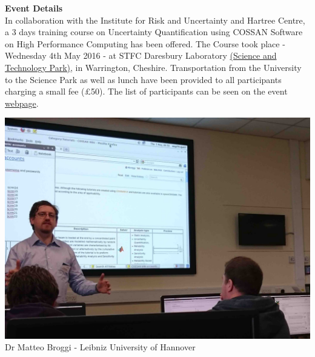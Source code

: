 \documentclass[11pt]{article}%
\begin{document}
\begin{minipage}{0.6\textwidth}
{\bf Event Details}\\
In collaboration with the Institute for Risk and Uncertainty and Hartree Centre, a 3 days training course on Uncertainty Quantification using COSSAN Software on High Performance Computing has been offered. The Course took place - Wednesday 4th May 2016 - at STFC Daresbury Laboratory \href{http://maps.google.com/maps?f=q\&source=s_q\&hl=en&geocode=\&q=Daresbury+Innovation+Centre+Warrington+WA4+4FS+United+Kingdom}{(Science and Technology Park)}, in Warrington, Cheshire. Transportation from the University to the Science Park as well as lunch have been provided to all participants charging a small fee (\pounds 50). The list of participants can be seen on the event  \href{https://eventbooking.stfc.ac.uk/news-events/cossan-software}{webpage}.
\end{minipage}
\begin{minipage}{0.39\linewidth}
\begin{center}
\includegraphics[width=0.95\linewidth]{training/matteo3_lr.jpg}\\
{\small Dr Matteo Broggi - Leibniz University of Hannover}
\end{center}
\end{minipage}
\end{document}
